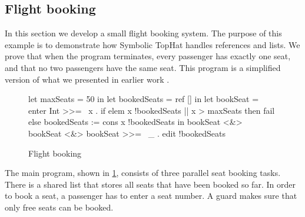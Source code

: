 \subsection{Flight booking}

In this section we develop a small flight booking system.
The purpose of this example is to demonstrate how Symbolic TopHat handles references and lists.
We prove that when the program terminates, every passenger has exactly one seat, and that no two passengers have the same seat.
This program is a simplified version of what we presented in earlier work \cite{Steenvoorden2019}.

\begin{figure}
\begin{TASK}
  let maxSeats = 50 in
  let bookedSeats = ref [] in
  let bookSeat = enter Int >>= \ x .
    if elem x !bookedSeats || x > maxSeats then fail else bookedSeats := cons x !bookedSeats in
  bookSeat <&> bookSeat <&> bookSeat >>= \ _ .
  edit !bookedSeats
\end{TASK}
\caption{Flight booking}
\label{fig:flight-booking}
\end{figure}

The main program, shown in \cref{fig:flight-booking}, consists of three parallel seat booking tasks.
There is a shared list that stores all seats that have been booked so far.
In order to book a seat, a passenger has to enter a seat number.
A guard makes sure that only free seats can be booked.

